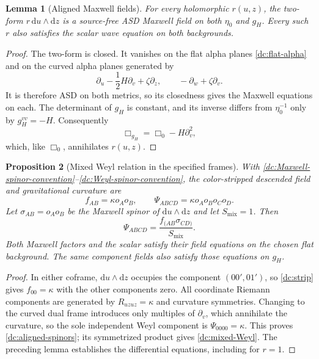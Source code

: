 \documentclass[11pt]{article}
\numberwithin{equation}{section}
\newtheorem{proposition}{Proposition}[section]
\newtheorem{lemma}[proposition]{Lemma}
\theoremstyle{remark}
\newcommand{\dd}{\mathrm d}
\begin{document}
\begin{lemma}[Aligned Maxwell fields]
For every holomorphic $r(u,z)$, the two-form
$r\,\dd u\wedge\dd z$ is a source-free ASD Maxwell field on both
$\eta_0$ and $g_H$. Every such $r$ also satisfies the scalar wave
equation on both backgrounds.
\end{lemma}
\begin{proof}
The two-form is closed. It vanishes on the flat alpha planes
\eqref{dc:flat-alpha} and on the curved alpha planes generated by
\[
 \partial_u-\frac12H\partial_v+\zeta\partial_z,
 \qquad -\partial_w+\zeta\partial_v.
\]
It is therefore ASD on both metrics, so its closedness gives the Maxwell
equations on each. The determinant of $g_H$ is constant, and its inverse
differs from $\eta_0^{-1}$ only by
$g_H^{vv}=-H$. Consequently
\begin{equation}\label{dc:curvedbox}
 \Box_{g_H}=\Box_0-H\partial_v^2,
\end{equation}
which, like $\Box_0$, annihilates $r(u,z)$.
\end{proof}

\begin{proposition}[Mixed Weyl relation in the specified frames]
With \eqref{dc:Maxwell-spinor-convention}--\eqref{dc:Weyl-spinor-convention},
the color-stripped descended field and gravitational curvature are
\begin{equation}\label{dc:aligned-spinors}
 f_{AB}=\kappa o_Ao_B,
 \qquad
 \Psi_{ABCD}=\kappa o_Ao_Bo_Co_D.
\end{equation}
Let $\sigma_{AB}=o_Ao_B$ be the Maxwell spinor of
$\dd u\wedge\dd z$ and let $S_{\mathrm{mix}}=1$. Then
\begin{equation}\label{dc:mixed-Weyl}
 \Psi_{ABCD}
 =\frac{f_{(AB}\sigma_{CD)}}{S_{\mathrm{mix}}}.
\end{equation}
Both Maxwell factors and the scalar satisfy their field equations on
the chosen flat background. The same component fields also satisfy
those equations on $g_H$.
\end{proposition}
\begin{proof}
In either coframe, $\dd u\wedge\dd z$ occupies the component
$(00',01')$, so \eqref{dc:strip} gives $f_{00}=\kappa$ with the other
components zero. All coordinate Riemann components are generated by
$R_{uzuz}=\kappa$ and curvature symmetries. Changing to the curved
dual frame introduces only multiples of $\partial_v$, which annihilate
the curvature, so the sole independent Weyl component is
$\Psi_{0000}=\kappa$. This proves \eqref{dc:aligned-spinors}; its
symmetrized product gives \eqref{dc:mixed-Weyl}. The preceding lemma
establishes the differential equations, including for $r=1$.
\end{proof}
\end{document}
